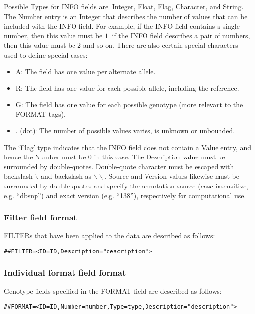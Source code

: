 \documentclass[8pt]{article}
\begin{document}
Possible Types for INFO fields are: Integer, Float, Flag, Character, and
String. 
The Number entry is an Integer that describes the number of values that
can be included with the INFO field. For example, if the INFO field contains a
single number, then this value must be $1$; if the INFO field describes a
pair of numbers, then this value must be $2$ and so on. There are also
certain special characters used to define special cases:

\begin{itemize}
  \item A: The field has one value per alternate allele.
  \item R: The field has one value for each possible allele, including the reference.
  \item G: The field has one value for each possible genotype (more relevant to the FORMAT tags).
  \item . (dot): The number of possible values varies, is unknown or unbounded.
\end{itemize}

The `Flag' type indicates that the INFO field does not contain a Value entry, and hence the Number must be $0$ in this case. The Description value must be surrounded by double-quotes. Double-quote character must be escaped with backslash $\backslash$ and backslash as $\backslash\backslash$. Source and Version values likewise must be surrounded by double-quotes and specify the annotation source (case-insensitive, e.g. ``dbsnp'') and exact version (e.g. ``138''), respectively for computational use.

\subsubsection{Filter field format}
FILTERs that have been applied to the data are described as follows:

\begin{verbatim}
##FILTER=<ID=ID,Description="description">
\end{verbatim}

\subsubsection{Individual format field format}
Genotype fields specified in the FORMAT field are described as follows:

\begin{verbatim}
##FORMAT=<ID=ID,Number=number,Type=type,Description="description">
\end{verbatim}
\end{document}
